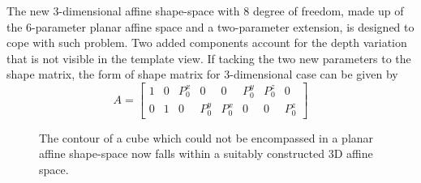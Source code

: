 The new 3-dimensional affine shape-space with 8 degree of freedom,
made up of the 6-parameter planar affine space and a two-parameter
extension, is designed to cope with such problem. Two added components
account for the depth variation that is not visible in the template
view. If tacking the two new parameters to the shape matrix, the form
of shape matrix for 3-dimensional case can be given by
\begin{equation}
  \label{eq:4.18}
  A =
  \begin{bmatrix}
    1 & 0 & P_0^x & 0 & 0 & P_0^y & P_0^z & 0\\
    0 & 1 & 0 & P_0^y & P_0^x & 0 & 0  & P_0^z
  \end{bmatrix}
\end{equation}

\begin{figure}[htbp]
  \begin{minipage}[t]{0.5\linewidth} 
    \centering 
  \end{minipage}%
  \begin{minipage}[t]{0.5\linewidth} 
    \centering 
  \end{minipage} 
  \caption[Non-planar contour has been successfully fitted]{The
    contour of a cube which could not be encompassed in a planar
    affine shape-space now falls within a suitably constructed 3D affine space.}
\label{fig:box_match}
\end{figure}

